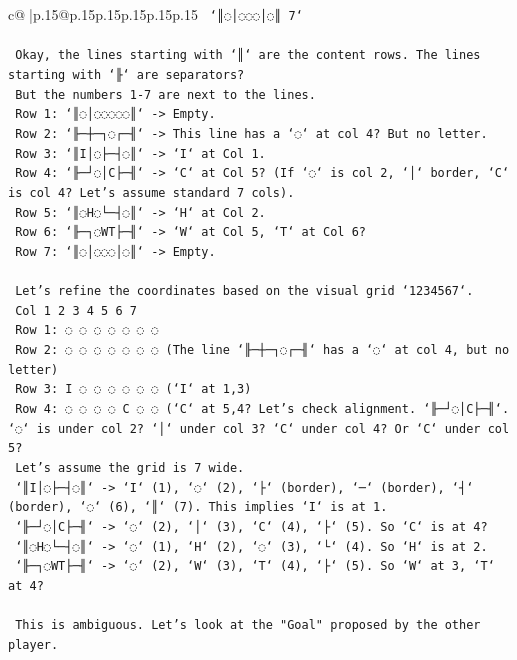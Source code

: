 \documentclass{article}
\begin{document}
{\begin{supertabular}{c@{$\;$}|p{.15\linewidth}@{}p{.15\linewidth}p{.15\linewidth}p{.15\linewidth}p{.15\linewidth}p{.15\linewidth}}
{{{\texttt{   `║◌│◌◌◌│◌║ 7`} \\
\\ 
\texttt{   Okay, the lines starting with `║` are the content rows. The lines starting with `╟` are separators?} \\
\texttt{   But the numbers 1{-}7 are next to the lines.} \\
\texttt{   Row 1: `║◌│◌◌◌◌◌║` {-}> Empty.} \\
\texttt{   Row 2: `╟─┼─┐◌┌─╢` {-}> This line has a `◌` at col 4? But no letter.} \\
\texttt{   Row 3: `║I│◌├─┤◌║` {-}> `I` at Col 1.} \\
\texttt{   Row 4: `╟─┘◌│C├─╢` {-}> `C` at Col 5? (If `◌` is col 2, `│` border, `C` is col 4? Let's assume standard 7 cols).} \\
\texttt{   Row 5: `║◌H◌└─┤◌║` {-}> `H` at Col 2.} \\
\texttt{   Row 6: `╟─┐◌WT├─╢` {-}> `W` at Col 5, `T` at Col 6?} \\
\texttt{   Row 7: `║◌│◌◌◌│◌║` {-}> Empty.} \\
\\ 
\texttt{   Let's refine the coordinates based on the visual grid `1234567`.} \\
\texttt{   Col 1 2 3 4 5 6 7} \\
\texttt{   Row 1: ◌ ◌ ◌ ◌ ◌ ◌ ◌} \\
\texttt{   Row 2: ◌ ◌ ◌ ◌ ◌ ◌ ◌ (The line `╟─┼─┐◌┌─╢` has a `◌` at col 4, but no letter)} \\
\texttt{   Row 3: I ◌ ◌ ◌ ◌ ◌ ◌ (`I` at 1,3)} \\
\texttt{   Row 4: ◌ ◌ ◌ ◌ C ◌ ◌ (`C` at 5,4? Let's check alignment. `╟─┘◌│C├─╢`. `◌` is under col 2? `│` under col 3? `C` under col 4? Or `C` under col 5?} \\
\texttt{   Let's assume the grid is 7 wide.} \\
\texttt{   `║I│◌├─┤◌║` {-}> `I` (1), `◌` (2), `├` (border), `─` (border), `┤` (border), `◌` (6), `║` (7). This implies `I` is at 1.} \\
\texttt{   `╟─┘◌│C├─╢` {-}> `◌` (2), `│` (3), `C` (4), `├` (5). So `C` is at 4?} \\
\texttt{   `║◌H◌└─┤◌║` {-}> `◌` (1), `H` (2), `◌` (3), `└` (4). So `H` is at 2.} \\
\texttt{   `╟─┐◌WT├─╢` {-}> `◌` (2), `W` (3), `T` (4), `├` (5). So `W` at 3, `T` at 4?} \\
\\ 
\texttt{   This is ambiguous. Let's look at the "Goal" proposed by the other player.} \\
}}}
\end{supertabular}}
\end{document}
